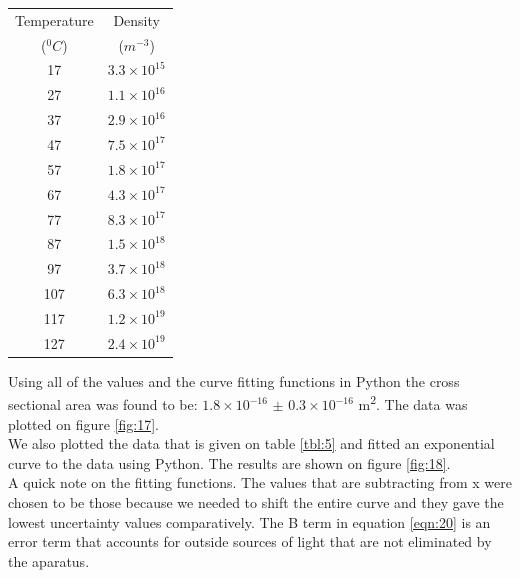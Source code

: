 \documentclass[twocolumn]{article}
\begin{document}
\begin{minipage}{\linewidth}
\center
\begin{tabular}{|c|c|}
\hline
Temperature & Density \\ 
($^0C$) & ($m^{-3}$) \\ \hline
17 & $3.3\times10^{15}$ \\ \hline
27 & $1.1\times10^{16}$ \\ \hline
37 & $2.9\times10^{16}$ \\ \hline
47 & $7.5\times10^{17}$ \\ \hline
57 & $1.8\times10^{17}$ \\ \hline
67 & $4.3\times10^{17}$ \\ \hline
77 & $8.3\times10^{17}$ \\ \hline
87 & $1.5\times10^{18}$ \\ \hline
97 & $3.7\times10^{18}$ \\ \hline
107 & $6.3\times10^{18}$ \\ \hline
117 & $1.2\times10^{19}$ \\ \hline
127 & $2.4\times10^{19}$ \\ \hline
\end{tabular}
\label{tbl:5}
\end{minipage}
Using all of the values and the curve fitting functions in Python the cross 
sectional area was found to be: $1.8\times10^{-16}$ $\pm$ $0.3\times10^{-16}$ 
m\textsuperscript{2}. The data was plotted on figure \ref{fig:17}.
\\
We also plotted the data that is given on table \ref{tbl:5} and fitted an 
exponential curve to the data using Python. The results are shown on figure 
\ref{fig:18}.
\\
A quick note on the fitting functions. The values that are subtracting from x 
were chosen to be those because we needed to shift the entire curve and they 
gave the lowest uncertainty values comparatively. The B term in equation 
\ref{eqn:20} is an error term that accounts for outside sources of light that 
are not eliminated by the aparatus.
\end{document}
